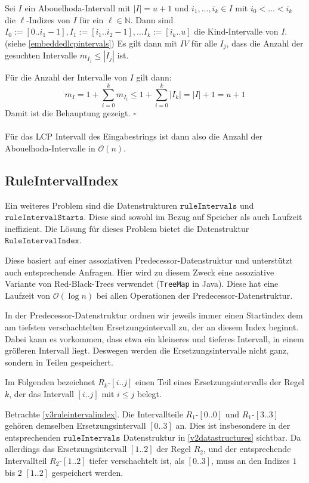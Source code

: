 Sei $I$ ein Abouelhoda-Intervall mit $|I| = u+1$ und $i_1, \dots, i_k \in I$ mit $i_0 < \dots < i_k$ die $\ell$-Indizes von $I$ für ein $\ell \in \mathbb{N}$. Dann sind $I_0 := [0..i_1-1], I_1 := [i_1..i_2-1], \dots I_k := [i_k..u]$ die Kind-Intervalle von $I$. (siehe \autoref{embeddedlcpintervals}) Es gilt dann mit $IV$ für alle $I_j$, dass die Anzahl der gesuchten Intervalle $m_{I_j} \leq |I_j|$ ist.

Für die Anzahl der Intervalle von $I$ gilt dann:
\begin{equation*}
    m_I = 1 + \sum_{i=0}^k m_{I_i} \leq 1 + \sum_{i=0}^k |I_k| = |I| + 1 = u + 1
\end{equation*}
Damit ist die Behauptung gezeigt. $\square$\\\\
Für das LCP Intervall des Eingabestrings ist dann also die Anzahl der Abouelhoda-Intervalle in $\mathcal{O}(n)$. 

\subsection{RuleIntervalIndex}
\label{riiv3}

Ein weiteres Problem sind die Datenstrukturen $\texttt{ruleIntervals}$ und $\texttt{ruleIntervalStarts}$. Diese sind sowohl im Bezug auf Speicher als auch Laufzeit ineffizient. Die Lösung für dieses Problem bietet die Datenstruktur $\texttt{RuleIntervalIndex}$.

Diese basiert auf einer assoziativen Predecessor-Datenstruktur \cite{dinklage_engineering_2021} und unterstützt auch entsprechende Anfragen. Hier wird zu diesem Zweck eine assoziative Variante von Red-Black-Trees \cite{bayer_symmetric_1972, guibas_dichromatic_1978} verwendet (\texttt{TreeMap} in Java). Diese hat eine Laufzeit von $\mathcal{O}(\log n)$ bei allen Operationen der Predecessor-Datenstruktur. 

In der Predecessor-Datenstruktur ordnen wir jeweils immer einen Startindex dem am tiefsten verschachtelten Ersetzungsintervall zu, der an diesem Index beginnt. Dabei kann es vorkommen, dass etwa ein kleineres und tieferes Intervall, in einem größeren Intervall liegt. Deswegen werden die Ersetzungsintervalle nicht ganz, sondern in Teilen gespeichert.

Im Folgenden bezeichnet $R_k$-$[i..j]$ einen Teil eines Ersetzungsintervalls der Regel $k$, der das Intervall $[i..j]$ mit $i \leq j$ belegt. 

Betrachte \autoref{v3ruleintervalindex}. Die Intervallteile $R_1$-$[0..0]$ und $R_1$-$[3..3]$ gehören demselben Ersetzungsintervall $[0..3]$ an. Dies ist insbesondere in der entsprechenden $\texttt{ruleIntervals}$ Datenstruktur in \autoref{v2datastructures} sichtbar. Da allerdings das Ersetzungsintervall $[1..2]$ der Regel $R_2$, und der entsprechende Intervallteil $R_2$-$[1..2]$ tiefer verschachtelt ist, als $[0..3]$, muss an den Indizes $1$ bis $2$ $[1..2]$ gespeichert werden.

